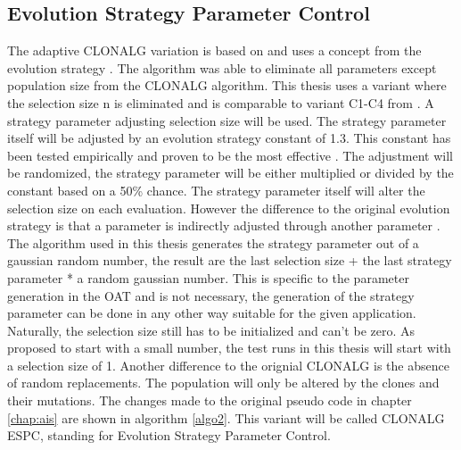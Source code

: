 \subsection{Evolution Strategy Parameter Control}
\label{espc}
The adaptive CLONALG variation is based on \cite{Garret04} and uses a concept from the evolution strategy \cite{evolution}. The algorithm was able to eliminate all parameters except population size from the CLONALG algorithm. This thesis uses a variant where the selection size n is eliminated and is comparable to variant C1-C4 from \cite{Garret04}. A strategy parameter adjusting selection size will be used. The strategy parameter itself will be adjusted by an evolution strategy constant of 1.3. This constant has been tested empirically and proven to be the most effective \cite{Garret04}. The adjustment will be randomized, the strategy parameter will be either multiplied or divided by the constant based on a 50\% chance. The strategy parameter itself will alter the selection size on each evaluation. However the difference to the original evolution strategy is that a parameter is indirectly adjusted through another parameter \cite{Garret04}. The algorithm used in this thesis generates the strategy parameter out of a gaussian random number, the result are the last selection size + the last strategy parameter * a random gaussian number. This is specific to the parameter generation in the OAT and is not necessary, the generation of the strategy parameter can be done in any other way suitable for the given application.  Naturally, the selection size still has to be initialized and can't be zero. As \cite{Garret04} proposed to start with a small number, the test runs in this thesis will start with a selection size of 1. Another difference to the orignial CLONALG is the absence of random replacements. The population will only be altered by the clones and their mutations. The changes made to the original pseudo code in chapter \ref{chap:ais} are shown in algorithm \ref{algo2}. This variant will be called CLONALG ESPC, standing for Evolution Strategy Parameter Control.\\\\
